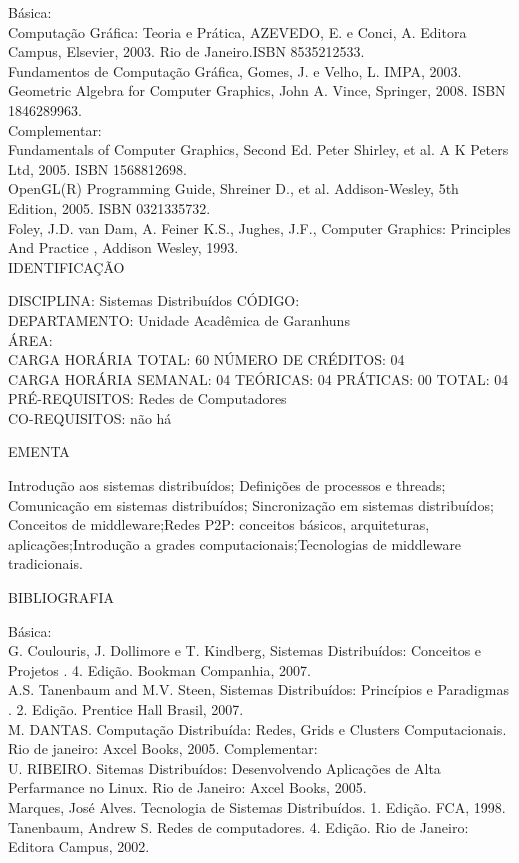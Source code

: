 \documentclass[
	12pt,				%
	openright,			%
  oneside,     %
	a4paper,			%
	chapter=TITLE,		%
	english,			%
	french,				%
	spanish,			%
	brazil				%
	]{abntex2}
\begin{document}
\begin{apendicesenv}
Básica:\\
Computação Gráfica: Teoria e Prática, AZEVEDO, E. e Conci, A. Editora
Campus, Elsevier, 2003. Rio de Janeiro.ISBN 8535212533.\\
Fundamentos de Computação Gráfica, Gomes, J. e Velho, L. IMPA, 2003.\\
Geometric Algebra for Computer Graphics, John A. Vince, Springer, 2008.
ISBN 1846289963.\\
Complementar:\\
Fundamentals of Computer Graphics, Second Ed. Peter Shirley, et al. A K
Peters Ltd, 2005. ISBN 1568812698.\\
OpenGL(R) Programming Guide, Shreiner D., et al. Addison-Wesley, 5th
Edition, 2005. ISBN 0321335732.\\
Foley, J.D. van Dam, A. Feiner K.S., Jughes, J.F.,
 Computer Graphics: Principles And
Practice , Addison Wesley, 1993.\\


\newpage IDENTIFICAÇÃO

DISCIPLINA: Sistemas Distribuídos CÓDIGO:\\ 
DEPARTAMENTO: Unidade Acadêmica de Garanhuns\\
ÁREA: \\
CARGA HORÁRIA TOTAL: 60 NÚMERO DE CRÉDITOS: 04\\
CARGA HORÁRIA SEMANAL: 04 TEÓRICAS: 04 PRÁTICAS: 00 TOTAL: 04\\
PRÉ-REQUISITOS: Redes de Computadores\\
CO-REQUISITOS: não há

EMENTA 

Introdução aos sistemas distribuídos; Definições de processos e threads;
Comunicação em sistemas distribuídos; Sincronização em sistemas
distribuídos; Conceitos de middleware;Redes P2P: conceitos básicos,
arquiteturas, aplicações;Introdução a grades computacionais;Tecnologias
de middleware tradicionais.

BIBLIOGRAFIA 

Básica:\\
G. Coulouris, J. Dollimore e T. Kindberg,  Sistemas
Distribuídos: Conceitos e Projetos . 4. Edição.
Bookman Companhia, 2007.\\
A.S. Tanenbaum and M.V. Steen,  Sistemas Distribuídos:
Princípios e Paradigmas . 2. Edição. Prentice Hall
Brasil, 2007.\\
M. DANTAS. Computação Distribuída: Redes, Grids e Clusters
Computacionais. Rio de janeiro: Axcel Books, 2005.
Complementar:\\
U. RIBEIRO. Sitemas Distribuídos: Desenvolvendo Aplicações de Alta
Perfarmance no Linux. Rio de Janeiro: Axcel Books, 2005.\\
Marques, José Alves. Tecnologia de Sistemas Distribuídos. 1. Edição.
FCA, 1998.\\
Tanenbaum, Andrew S. Redes de computadores. 4. Edição. Rio de Janeiro:
Editora Campus, 2002.
\newpage 


\end{apendicesenv}
\end{document}
